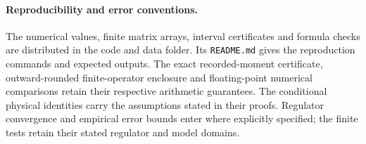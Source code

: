 \documentclass[11pt,a4paper]{article}
\begin{document}
\paragraph{Reproducibility and error conventions.}
The numerical values, finite matrix arrays, interval certificates and formula checks are distributed in the code and data folder. Its \texttt{README.md} gives the reproduction commands and expected outputs. The exact recorded-moment certificate, outward-rounded finite-operator enclosure and floating-point numerical comparisons retain their respective arithmetic guarantees. The conditional physical identities carry the assumptions stated in their proofs. Regulator convergence and empirical error bounds enter where explicitly specified; the finite tests retain their stated regulator and model domains.
\end{document}
